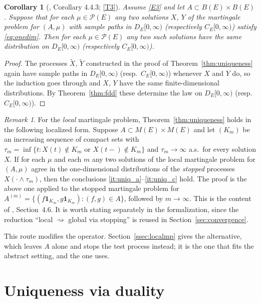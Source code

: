 \documentclass[11pt,a4paper]{article}
\theoremstyle{plain}
\newtheorem{corollary}[theorem]{Corollary}
\theoremstyle{definition}
\theoremstyle{remark}
\newtheorem{remark}[theorem]{Remark}
\newcommand{\Meas}{M}                          %
\newcommand{\Bdd}{B}                           %
\newcommand{\Prob}{\mathcal{P}}                %
\newcommand{\DE}{D_E[0,\infty)}
\newcommand{\CE}{C_E[0,\infty)}
\newcommand{\one}{\mathbf{1}}
\newcommand{\EK}{\cite{EK86}}
\newcommand{\KA}{\cite{Kal21}}
\begin{document}
\begin{corollary}[\EK, Corollary 4.4.3; \eqref{T3}]
  \label{cor:DEuniqueness}
  Assume \eqref{E3} and let $A \subset \Bdd(E) \times \Bdd(E)$.  Suppose that for
  each $\mu \in \Prob(E)$ any two solutions $X$, $Y$ of the martingale problem
  for $(A,\mu)$ with sample paths in $\DE$ (respectively $\CE$) satisfy
  \eqref{eq:onedim}.  Then for each $\mu \in \Prob(E)$ any two such solutions
  have the same distribution on $\DE$ (respectively $\CE$).
\end{corollary}

\begin{proof}
  The processes $\tilde X$, $\tilde Y$ constructed in the proof of
  Theorem~\ref{thm:uniqueness} again have sample paths in $\DE$ (resp.\ $\CE$)
  whenever $X$ and $Y$ do, so the induction goes through and $X$, $Y$ have the
  same finite-dimensional distributions.  By Theorem~\ref{thm:fdd} these determine
  the law on $\DE$ (resp.\ $\CE$).
\end{proof}

\begin{remark}
  \label{rem:uniquelocal}
  For the \emph{local} martingale problem, Theorem~\ref{thm:uniqueness} holds in
  the following localized form.  Suppose $A \subset \Meas(E) \times \Meas(E)$ and
  let $(K_m)$ be an increasing sequence of compact sets with
  $\tau_m = \inf\{t : X(t) \notin K_m \text{ or } X(t-) \notin K_m\}$ and
  $\tau_m \to \infty$ a.s.\ for every solution $X$.  If for each $\mu$ and each
  $m$ any two solutions of the local martingale problem for $(A,\mu)$ agree in
  the one-dimensional distributions of the \emph{stopped} processes
  $X(\cdot \wedge \tau_m)$, then the conclusions \ref{it:uniq_a}--\ref{it:uniq_c}
  hold.  The proof is the above one applied to the stopped martingale problem for
  $A^{(m)} = \{(f \one_{K_m}, g \one_{K_m}) : (f,g) \in A\}$, followed by
  $m \to \infty$.  This is the content of \EK, Section~4.6.  It is worth stating
  separately in the formalization, since the reduction ``local $\rightsquigarrow$
  global via stopping'' is reused in Section~\ref{sec:convergence}.

  This route modifies the operator.  Section~\ref{ssec:localmp} gives the
  alternative, which leaves $A$ alone and stops the test process instead; it is
  the one that fits the abstract setting, and the one \KA{} uses.
\end{remark}

\section{Uniqueness via duality}
\label{sec:duality}
\end{document}
